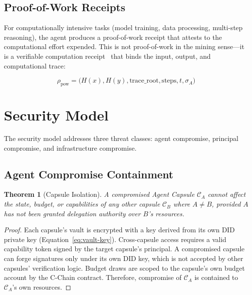 \documentclass[11pt,a4paper]{article}
\newtheorem{theorem}{Theorem}
\begin{document}
\subsection{Proof-of-Work Receipts}

For computationally intensive tasks (model training, data processing, multi-step reasoning), the agent produces a proof-of-work receipt that attests to the computational effort expended. This is not proof-of-work in the mining sense---it is a verifiable computation receipt~\cite{gennaro2010verifiable} that binds the input, output, and computational trace:

\begin{equation}\label{eq:pow-receipt}
    \rho_{\text{pow}} = \big(H(x), H(y), \text{trace\_root}, \text{steps}, t, \sigma_A\big)
\end{equation}

\section{Security Model}\label{sec:security}

The security model addresses three threat classes: agent compromise, principal compromise, and infrastructure compromise.

\subsection{Agent Compromise Containment}

\begin{theorem}[Capsule Isolation]
A compromised Agent Capsule $\mathcal{C}_A$ cannot affect the state, budget, or capabilities of any other capsule $\mathcal{C}_B$ where $A \neq B$, provided $A$ has not been granted delegation authority over $B$'s resources.
\end{theorem}

\begin{proof}
Each capsule's vault is encrypted with a key derived from its own DID private key (Equation~\ref{eq:vault-key}). Cross-capsule access requires a valid capability token signed by the target capsule's principal. A compromised capsule can forge signatures only under its own DID key, which is not accepted by other capsules' verification logic. Budget draws are scoped to the capsule's own budget account by the C-Chain contract. Therefore, compromise of $\mathcal{C}_A$ is contained to $\mathcal{C}_A$'s own resources.
\end{proof}
\end{document}

